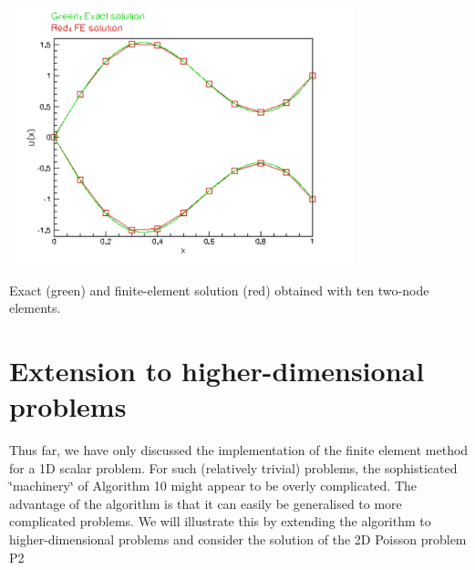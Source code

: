  
\begin{DoxyImage}
\includegraphics[width=0.75\textwidth]{fish}
\caption{Exact (green) and finite-\/element solution (red) obtained with ten two-\/node elements. }
\end{DoxyImage}




 

\hypertarget{index_higher_dims}{}\section{Extension to higher-\/dimensional problems}\label{index_higher_dims}
Thus far, we have only discussed the implementation of the finite element method for a 1\-D scalar problem. For such (relatively trivial) problems, the sophisticated \char`\"{}machinery\char`\"{} of Algorithm 10 might appear to be overly complicated. The advantage of the algorithm is that it can easily be generalised to more complicated problems. We will illustrate this by extending the algorithm to higher-\/dimensional problems and consider the solution of the 2\-D Poisson problem P2

